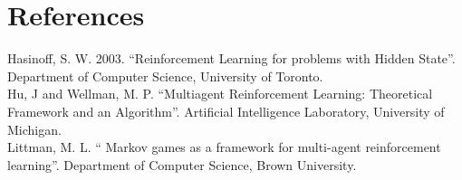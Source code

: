 \documentclass[letterpaper]{article}
\begin{document}
\section{References}
Hasinoff, S. W. 2003. ``Reinforcement Learning for problems with Hidden State''. Department of Computer Science, University of Toronto.\\

Hu, J and Wellman, M. P. ``Multiagent Reinforcement Learning: Theoretical Framework and an Algorithm''. Artificial Intelligence Laboratory, University of Michigan.\\

Littman, M. L. `` Markov games as a framework for multi-agent reinforcement learning''. Department of Computer Science, Brown University.
\end{document}
